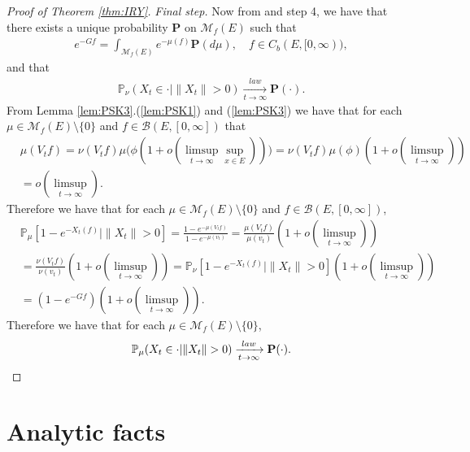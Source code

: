 \documentclass[12pt,a4paper]{amsart}
\numberwithin{equation}{section}
\theoremstyle{plain}
\theoremstyle{definition}
\begin{document}
\begin{proof}[Proof of Theorem \ref{thm:IRY}]
\emph{Final step.}
Now from \cite[Proposition 1.19]{Li2011MeasureValued} and step 4, we have that there exists a unique probability $\mathbf P$ on $\mathcal M_f(E)$ such that 
\begin{align}
  e^{-Gf}
  = \int_{\mathcal M_f(E)} e^{- \mu(f)} \mathbf P(d\mu)
  , \quad f\in C_b (E, [0,\infty)),
\end{align}
and that
\begin{align}
	\mathbb P_{\nu}(X_t \in \cdot | \|X_t\|>0 ) 
  \xrightarrow[t\to \infty]{law} \mathbf P(\cdot).
\end{align}
From Lemma \ref{lem:PSK3}.(\ref{lem:PSK1}) and (\ref{lem:PSK3}) we have that for each $\mu \in \mathcal M_f(E)\setminus \{0\}$ and $f \in \mathcal B(E,[0,\infty])$ that 
\begin{align}
	& \mu(V_tf) = \nu(V_tf) \mu\Big(\phi(1+o(\limsup_{t\to \infty}\sup_{x\in E})) \Big)
   = \nu(V_tf) \mu(\phi)(1+o(\limsup_{t\to \infty}))
  \\ & = o(\limsup_{t\to \infty}).
\end{align}
Therefore we have that for each $\mu \in \mathcal M_f(E)\setminus\{0\}$ and $f\in \mathcal B(E,[0,\infty])$, 
\begin{align}
  &\mathbb P_\mu[1 - e^{-X_t(f)}|\|X_t\|>0]
  = \frac{1 - e^{- \mu(V_tf)}}{1 - e^{-\mu(v_t)}}
  = \frac{\mu(V_tf)}{\mu(v_t)} (1+o(\limsup_{t\to \infty}))
  \\&= \frac{\nu(V_tf)}{\nu(v_t)}(1+o(\limsup_{t\to \infty})) 
  = \mathbb P_\nu [1 - e^{-X_t(f)}|\|X_t\|>0](1+o(\limsup_{t\to \infty}))
  \\ & = (1 - e^{-Gf}) (1+o(\limsup_{t\to \infty})).
\end{align}
Therefore we have that for each $\mu \in \mathcal M_f(E)\setminus\{0\}$,
\[
  \mathbb P_\mu(X_t \in \cdot | \|X_t\|>0)
  \xrightarrow[t\to \infty]{law} \mathbf P(\cdot).
  \qedhere
\]
\end{proof}

\appendix
\section{Analytic facts}
\end{document}
